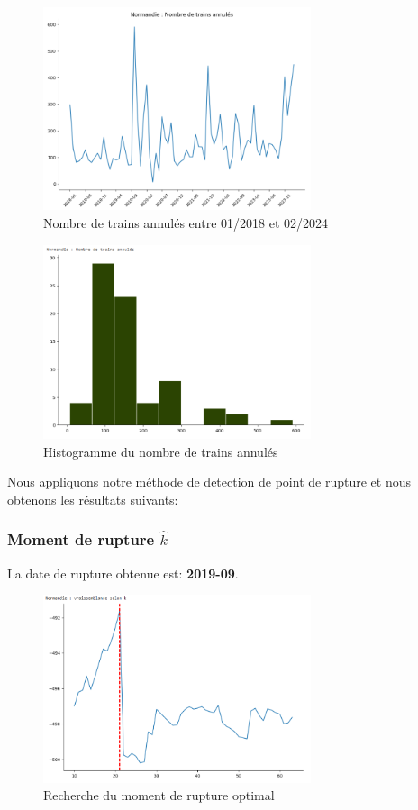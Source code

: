 {\begin{figure}[H]
  \centering
  \includegraphics[width=0.7\textwidth]{Nor_TA_1.png}
  \caption{Nombre de trains annulés entre 01/2018 et 02/2024}
\end{figure}

\begin{figure}[H]
  \centering
  \includegraphics[width=0.7\textwidth]{Nor_TA_2.png}
  \caption{Histogramme du nombre de trains annulés}
\end{figure}

Nous appliquons notre méthode de detection de point de rupture et nous obtenons les résultats suivants:

\subsubsection{Moment de rupture $\hat{k}$}

La date de rupture obtenue est: \textbf{2019-09}. 

\begin{figure}[H]
  \centering
  \includegraphics[width=0.7\textwidth]{Nor_TA_3_bis.png}
  \caption{Recherche du moment de rupture optimal}
\end{figure}

}
